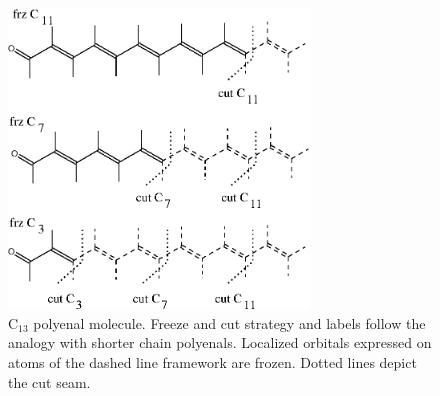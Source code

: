 \begin{center}
\begin{figure}[h!]
\begin{center}
\includegraphics[width=8cm,keepaspectratio]{02_localization/images/C13-selection.eps}
\end{center}
\caption{\footnotesize C$_{13}$ polyenal molecule. Freeze and cut strategy
and labels follow the analogy with shorter chain polyenals. Localized
orbitals expressed on atoms of the dashed line framework are frozen.
Dotted lines depict the cut seam.  }
\label{fig:C13-selection}
\end{figure}
\end{center}

